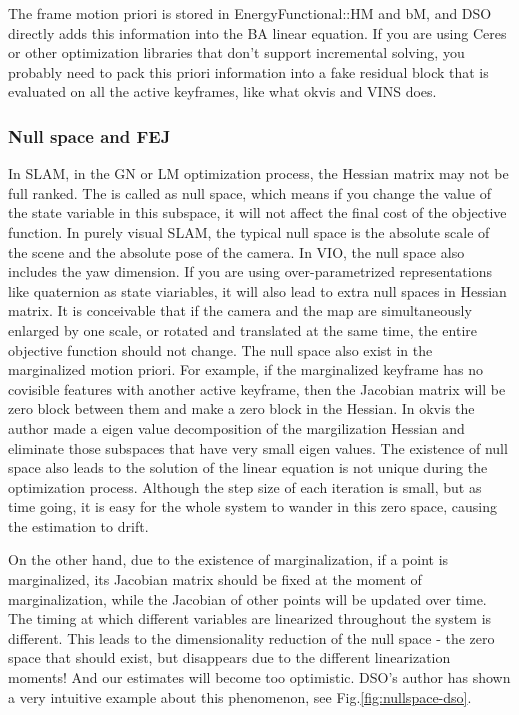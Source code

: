 \documentclass[a4paper,10pt]{article}
\begin{document}
	The frame motion priori is stored in EnergyFunctional::HM and bM, and DSO directly adds this information into the BA linear equation. If you are using Ceres or other optimization libraries that don't support incremental solving, you probably need to pack this priori information into a fake residual block that is evaluated on all the active keyframes, like what okvis \cite{leutenegger2015keyframe} and VINS \cite{qin2017vins} does.
	
	\subsubsection{Null space and FEJ}
	In SLAM, in the GN or LM optimization process, the Hessian matrix may not be full ranked. The is called as null space, which means if you change the value of the state variable in this subspace, it will not affect the final cost of the objective function. In purely visual SLAM, the typical null space is the absolute scale of the scene and the absolute pose of the camera. In VIO, the null space also includes the yaw dimension. If you are using over-parametrized representations like quaternion as state viariables, it will also lead to extra null spaces in Hessian matrix. It is conceivable that if the camera and the map are simultaneously enlarged by one scale, or rotated and translated at the same time, the entire objective function should not change. The null space also exist in the marginalized motion priori. For example, if the marginalized keyframe has no covisible features with another active keyframe, then the Jacobian matrix will be zero block between them and make a zero block in the Hessian. In okvis \cite{leutenegger2015keyframe} the author made a eigen value decomposition of the margilization Hessian and eliminate those subspaces that have very small eigen values.  The existence of null space also leads to the solution of the linear equation is not unique during the optimization process. Although the step size of each iteration is small, but as time going, it is easy for the whole system to wander in this zero space, causing the estimation to drift.
	
	On the other hand, due to the existence of marginalization, if a point is marginalized, its Jacobian matrix should be fixed at the moment of marginalization, while the Jacobian of other points will be updated over time. The timing at which different variables are linearized throughout the system is different. This leads to the dimensionality reduction of the null space - the zero space that should exist, but disappears due to the different linearization moments! And our estimates will become too optimistic. DSO's author has shown a very intuitive example about this phenomenon, see Fig.\ref{fig:nullspace-dso}. 
	
\end{document}
